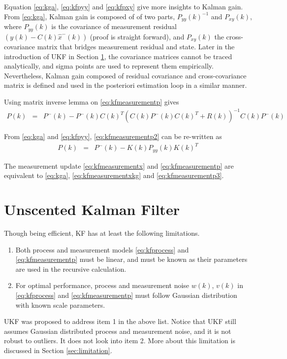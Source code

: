 Equation \eqref{eq:kga}, \eqref{eq:kfpyy} and \eqref{eq:kfpxy} give more insights to Kalman gain. From \eqref{eq:kga}, Kalman gain is composed of of two parts,  $P_{yy}(k)^{-1}$ and $P_{xy}(k)$, where $P_{yy}(k)$ is the covariance of measurement residual $\left(y(k)-C(k)\hat{x}^-(k)\right)$ (proof is straight forward), and $P_{xy}(k)$ the cross-covariance matrix that bridges measurement residual and state. Later in the introduction of UKF in Section \ref{sec:ukf}, the covariance matrices cannot be traced analytically, and sigma points are used to represent them empirically. Nevertheless, Kalman gain composed of residual covariance and cross-covariance matrix is defined and used in the posteriori estimation loop in a similar manner.

Using matrix inverse lemma on \eqref{eq:kfmeasurementp} gives
\begin{eqnarray}
	P(k) &=& P^-(k) - P^-(k)C(k)^T\left(C(k)P^-(k)C(k)^T + R(k)\right)^{-1}C(k)P^-(k) \label{eq:kfmeasurementp2}
\end{eqnarray}

From \eqref{eq:kga} and \eqref{eq:kfpyy}, \eqref{eq:kfmeasurementp2} can be re-written as
\begin{eqnarray}
	P(k) &=& P^-(k) - K(k)P_{yy}(k)K(k)^T \label{eq:kfmeasurementp3}
\end{eqnarray}

The measurement update \eqref{eq:kfmeasurementx} and \eqref{eq:kfmeasurementp} are equivalent to \eqref{eq:kga}, \eqref{eq:kfmeasurementxkg} and \eqref{eq:kfmeasurementp3}.

\section{Unscented Kalman Filter} \label{sec:ukf}

Though being efficient, KF has at least the following limitations.
\begin{enumerate}
	\item Both process and measurement models \eqref{eq:kfprocess} and \eqref{eq:kfmeasurementp} must be linear, and must be known as their parameters are used in the recursive calculation.
	\item For optimal performance, process and measurement noise $w(k)$, $v(k)$ in \eqref{eq:kfprocess} and \eqref{eq:kfmeasurementp} must follow Gaussian distribution with known scale parameters. 
\end{enumerate}

UKF was proposed to address item 1 in the above list. Notice that UKF still assumes Gaussian distributed process and measurement noise, and it is not robust to outliers. It does not look into item 2. More about this limitation is discussed in Section \ref{sec:limitation}.

